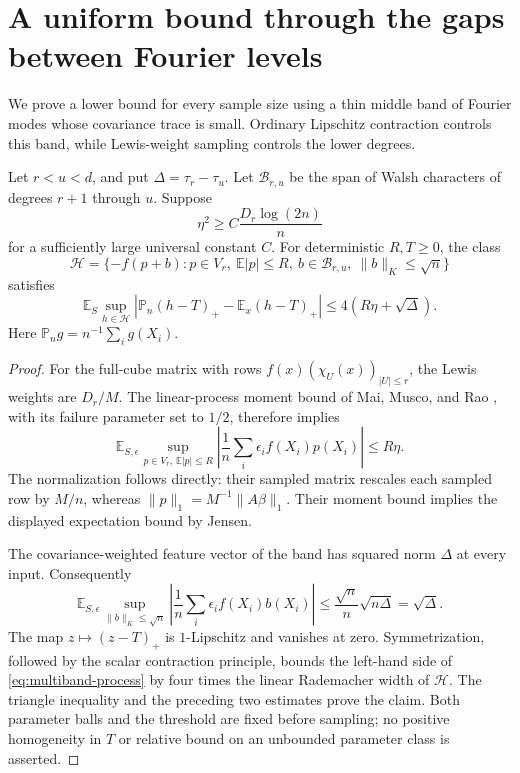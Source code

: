 \section{A uniform bound through the gaps between Fourier levels}
We prove a lower bound for every sample size using a thin middle band
of Fourier modes whose covariance trace is small. Ordinary Lipschitz
contraction controls this band, while Lewis-weight sampling controls
the lower degrees.

\begin{lemma}\label{lem:multiband-process}
Let $r<u<d$, and put $\Delta=\tau_r-\tau_u$. Let
$\mathcal B_{r,u}$ be the span of Walsh characters of degrees $r+1$
through $u$. Suppose
\[
 \eta^2\ge C\frac{D_r\log(2n)}n
\]
for a sufficiently large universal constant $C$. For deterministic
$R,T\ge0$, the class
\[
 \mathcal H=\{-f(p+b):p\in V_r,\ \mathbb E|p|\le R,
                 \ b\in\mathcal B_{r,u},\ \|b\|_K\le\sqrt n\}
\]
satisfies
\begin{equation}\label{eq:multiband-process}
 \mathbb E_S\sup_{h\in\mathcal H}
   |\mathbb P_n(h-T)_+-\mathbb E_x(h-T)_+|
 \le4(R\eta+\sqrt\Delta).
\end{equation}
Here $\mathbb P_n g=n^{-1}\sum_i g(X_i)$.
\end{lemma}
\begin{proof}
For the full-cube matrix with rows $f(x)(\chi_U(x))_{|U|\le r}$,
the Lewis weights are $D_r/M$. The linear-process moment bound of
Mai, Musco, and Rao \cite[Theorem 3]{mai2021coresets}, with its failure
parameter set to $1/2$, therefore implies
\[
 \mathbb E_{S,\epsilon}\sup_{p\in V_r,\,\mathbb E|p|\le R}
 \left|\frac1n\sum_i\epsilon_i f(X_i)p(X_i)\right|\le R\eta.
\]
The normalization follows directly: their sampled matrix rescales each
sampled row by $M/n$, whereas $\|p\|_1=M^{-1}\|A\beta\|_1$.
Their moment bound implies the displayed expectation bound by Jensen.

The covariance-weighted feature vector of the band has squared norm
$\Delta$ at every input. Consequently
\[
 \mathbb E_{S,\epsilon}\sup_{\|b\|_K\le\sqrt n}
 \left|\frac1n\sum_i\epsilon_i f(X_i)b(X_i)\right|
 \le\frac{\sqrt n}{n}\sqrt{n\Delta}=\sqrt\Delta.
\]
The map $z\mapsto(z-T)_+$ is $1$-Lipschitz and vanishes at zero.
Symmetrization, followed by the scalar contraction principle, bounds
the left-hand side of \eqref{eq:multiband-process} by four times the
linear Rademacher width of $\mathcal H$. The triangle inequality and
the preceding two estimates prove the claim. Both parameter balls and
the threshold are fixed before sampling; no positive homogeneity in
$T$ or relative bound on an unbounded parameter class is asserted.
\end{proof}

